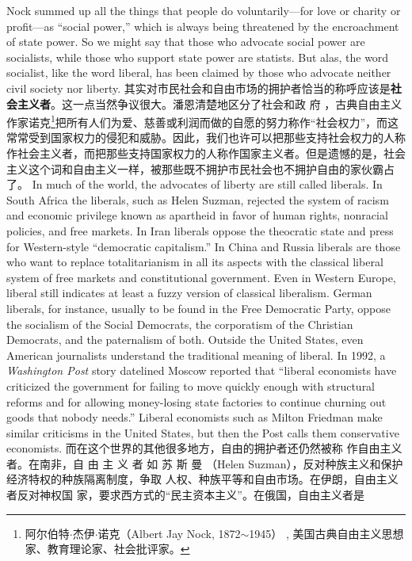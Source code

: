 \begin{paracol}{2}
Nock summed up all the things that people do voluntarily---for
love or charity or profit---as ``social power,'' which is always
being threatened by the encroachment of state power. So we
might say that those who advocate social power are socialists,
while those who support state power are statists. But alas, the
word socialist, like the word liberal, has been claimed by those
who advocate neither civil society nor liberty.
\switchcolumn
其实对市民社会和自由市场的拥护者恰当的称呼应该是\textbf{社
会主义者}。这一点当然争议很大。潘恩清楚地区分了社会和政
府 ，古典自由主义作家诺克\footnote{阿尔伯特$\cdot$杰伊$\cdot$诺克（Albert Jay Nock, 1872$\sim$1945） , 美国古典自由主义思想家、教育理论家、社会批评家。}把所有人们为爱、慈善或利润而做的自愿的努力称作“社会权力”，而这常常受到国家权力的侵犯和威胁。因此，我们也许可以把那些支持社会权力的人称作社会主义者，而把那些支持国家权力的人称作国家主义者。但是遗憾的是，社会主义这个词和自由主义一样，被那些既不拥护市民社会也不拥护自由的家伙霸占了。
\switchcolumn*
In much of the world, the advocates of liberty are still called
liberals. In South Africa the liberals, such as Helen Suzman, rejected the system of racism and economic privilege known as
apartheid in favor of human rights, nonracial policies, and free
markets. In Iran liberals oppose the theocratic state and press
for Western-style ``democratic capitalism.'' In China and Russia
liberals are those who want to replace totalitarianism in all its
aspects with the classical liberal system of free markets and constitutional government. Even in Western Europe, liberal still
indicates at least a fuzzy version of classical liberalism. German
liberals, for instance, usually to be found in the Free Democratic Party, oppose the socialism of the Social Democrats, the corporatism of the Christian Democrats, and the paternalism of
both. Outside the United States, even American journalists understand the traditional meaning of liberal. In 1992, a \textit{Washington Post} story datelined Moscow reported that ``liberal
economists have criticized the government for failing to move
quickly enough with structural reforms and for allowing
money-losing state factories to continue churning out goods
that nobody needs.'' Liberal economists such as Milton Friedman make similar criticisms in the United States, but then the
Post calls them conservative economists.
\switchcolumn
而在这个世界的其他很多地方，自由的拥护者还仍然被称
作自由主义者。在南非，自 由 主 义 者 如 苏 斯 曼 （Helen  Suzman），反对种族主义和保护经济特权的种族隔离制度，争取
人权、种族平等和自由市场。在伊朗，自由主义者反对神权国
家，要求西方式的“民主资本主义”。在俄国，自由主义者是

\end{paracol}
